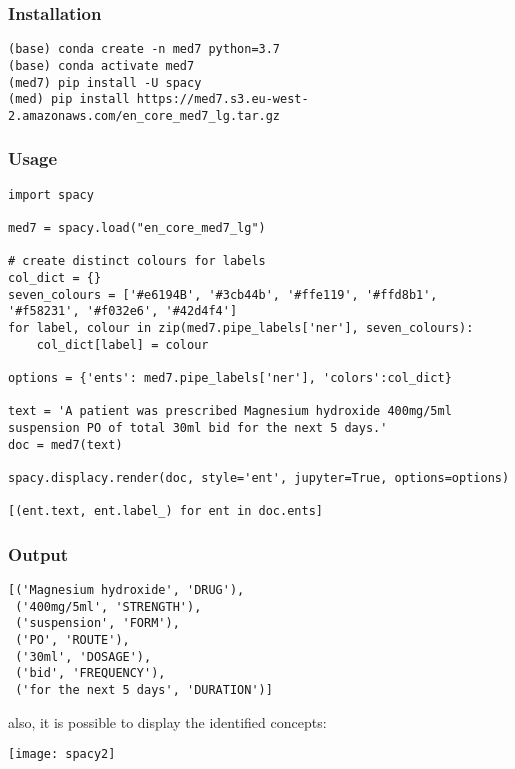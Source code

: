 \begin{frame}[fragile]\frametitle{Installation}


\begin{lstlisting}
(base) conda create -n med7 python=3.7
(base) conda activate med7
(med7) pip install -U spacy
(med) pip install https://med7.s3.eu-west-2.amazonaws.com/en_core_med7_lg.tar.gz

\end{lstlisting}


\end{frame}

\begin{frame}[fragile]\frametitle{Usage}


\begin{lstlisting}
import spacy

med7 = spacy.load("en_core_med7_lg")

# create distinct colours for labels
col_dict = {}
seven_colours = ['#e6194B', '#3cb44b', '#ffe119', '#ffd8b1', '#f58231', '#f032e6', '#42d4f4']
for label, colour in zip(med7.pipe_labels['ner'], seven_colours):
    col_dict[label] = colour

options = {'ents': med7.pipe_labels['ner'], 'colors':col_dict}

text = 'A patient was prescribed Magnesium hydroxide 400mg/5ml suspension PO of total 30ml bid for the next 5 days.'
doc = med7(text)

spacy.displacy.render(doc, style='ent', jupyter=True, options=options)

[(ent.text, ent.label_) for ent in doc.ents]
\end{lstlisting}


\end{frame}

\begin{frame}[fragile]\frametitle{Output}


\begin{lstlisting}
[('Magnesium hydroxide', 'DRUG'),
 ('400mg/5ml', 'STRENGTH'),
 ('suspension', 'FORM'),
 ('PO', 'ROUTE'),
 ('30ml', 'DOSAGE'),
 ('bid', 'FREQUENCY'),
 ('for the next 5 days', 'DURATION')]
\end{lstlisting}

also, it is possible to display the identified concepts:

\begin{center}
\texttt{[image: spacy2]}
\end{center}

\end{frame}